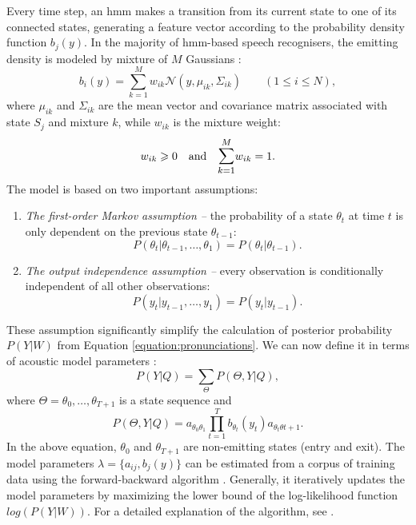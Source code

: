 Every time step, an \gls{hmm} makes a transition from its current state to one of its connected states, generating a feature vector according to the probability density function $b_{j}(y)$. In the majority of \gls{hmm}-based speech recognisers, the emitting density is modeled by mixture of $M$ Gaussians \cite{juang1985mixture}:
\begin{equation}
  b_{i}(y)=\sum_{k=1}^{M}w_{ik}\mathcal{N}(y, \mu_{ik}, \Sigma_{ik}) \qquad (1 \leqslant i \leqslant N),
\end{equation}
where $\mu_{ik}$ and $\Sigma_{ik}$ are the mean vector and covariance matrix associated with state $S_{j}$ and mixture $k$, while $w_{ik}$ is the mixture weight:
\begin{equation}
w_{ik} \geqslant 0 \quad\text{and}\quad \mathlarger{\sum_{k=1}^{M}}w_{ik}=1.
\end{equation}
The model is based on two important assumptions:
\begin{enumerate}
\item \emph{The first-order Markov assumption --} the probability of a state $\theta_{t}$ at time $t$ is only dependent on the previous state $\theta_{t-1}$:
  \begin{equation}
    P(\theta_{t}|\theta_{t-1}, \ldots, \theta_{1})=P(\theta_{t}|\theta_{t-1}).
  \end{equation}
\item \emph{The output independence assumption --} every observation is conditionally independent of all other observations: 
  \begin{equation}
    P(y_{t}|y_{t-1}, \ldots, y_{1})=P(y_{t}|y_{t-1}).
  \end{equation}
\end{enumerate}
These assumption significantly simplify the calculation of posterior probability $P(Y|W)$ from Equation \ref{equation:pronunciations}. We can now define it in terms of acoustic model parameters \cite{lu2013subspace}:
\begin{equation}
  P(Y|Q)=\sum_{\Theta}P(\Theta, Y|Q),
\end{equation}
where $\Theta=\theta_{0}, \ldots, \theta_{T+1}$ is a state sequence and
\begin{equation}
  \label{equation:states}
  P(\Theta, Y|Q)=a_{\theta_{0}\theta_{1}}\prod_{t=1}^{T}b_{\theta_{t}}(y_{t})a_{\theta_{t}\theta{t+1}}.
\end{equation}
In the above equation, $\theta_{0}$ and $\theta_{T+1}$ are non-emitting states (entry and exit). The model parameters $\lambda=\{a_{ij}, b_{j}(y)\}$ can be estimated from a corpus of training data using the forward-backward algorithm \cite{baum1970maximization}. Generally, it iteratively updates the model parameters by maximizing the lower bound of the log-likelihood function $log(P(Y|W))$. For a detailed explanation of the algorithm, see \cite{gales2008application}.

